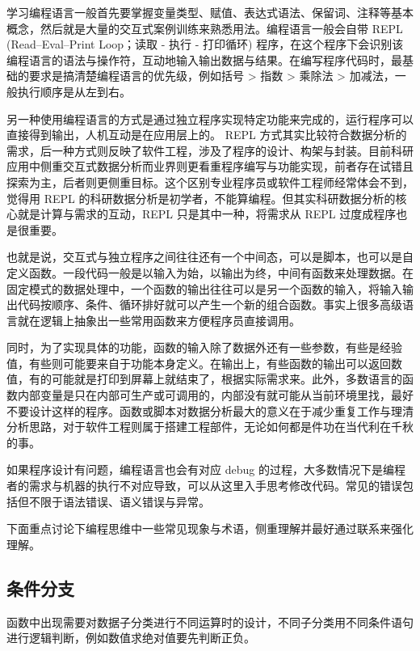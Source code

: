 \documentclass[]{book}
\begin{document}
学习编程语言一般首先要掌握变量类型、赋值、表达式语法、保留词、注释等基本概念，然后就是大量的交互式案例训练来熟悉用法。编程语言一般会自带 REPL (Read--Eval--Print Loop；读取 - 执行 - 打印循环) 程序，在这个程序下会识别该编程语言的语法与操作符，互动地输入输出数据与结果。在编写程序代码时，最基础的要求是搞清楚编程语言的优先级，例如括号 \textgreater{} 指数 \textgreater{} 乘除法 \textgreater{} 加减法，一般执行顺序是从左到右。

另一种使用编程语言的方式是通过独立程序实现特定功能来完成的，运行程序可以直接得到输出，人机互动是在应用层上的。 REPL 方式其实比较符合数据分析的需求，后一种方式则反映了软件工程，涉及了程序的设计、构架与封装。目前科研应用中侧重交互式数据分析而业界则更看重程序编写与功能实现，前者存在试错且探索为主，后者则更侧重目标。这个区别专业程序员或软件工程师经常体会不到，觉得用 REPL 的科研数据分析是初学者，不能算编程。但其实科研数据分析的核心就是计算与需求的互动，REPL 只是其中一种，将需求从 REPL 过度成程序也是很重要。

也就是说，交互式与独立程序之间往往还有一个中间态，可以是脚本，也可以是自定义函数。一段代码一般是以输入为始，以输出为终，中间有函数来处理数据。在固定模式的数据处理中，一个函数的输出往往可以是另一个函数的输入，将输入输出代码按顺序、条件、循环排好就可以产生一个新的组合函数。事实上很多高级语言就在逻辑上抽象出一些常用函数来方便程序员直接调用。

同时，为了实现具体的功能，函数的输入除了数据外还有一些参数，有些是经验值，有些则可能要来自于功能本身定义。在输出上，有些函数的输出可以返回数值，有的可能就是打印到屏幕上就结束了，根据实际需求来。此外，多数语言的函数内部变量是只在内部可生产或可调用的，内部没有就可能从当前环境里找，最好不要设计这样的程序。函数或脚本对数据分析最大的意义在于减少重复工作与理清分析思路，对于软件工程则属于搭建工程部件，无论如何都是件功在当代利在千秋的事。

如果程序设计有问题，编程语言也会有对应 debug 的过程，大多数情况下是编程者的需求与机器的执行不对应导致，可以从这里入手思考修改代码。常见的错误包括但不限于语法错误、语义错误与异常。

下面重点讨论下编程思维中一些常见现象与术语，侧重理解并最好通过联系来强化理解。

\hypertarget{ux6761ux4ef6ux5206ux652f}{%
\subsection{条件分支}\label{ux6761ux4ef6ux5206ux652f}}

函数中出现需要对数据子分类进行不同运算时的设计，不同子分类用不同条件语句进行逻辑判断，例如数值求绝对值要先判断正负。
\end{document}
